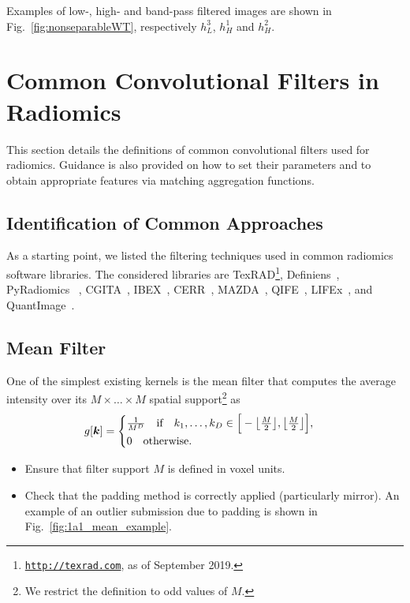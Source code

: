 \documentclass[fleqn,a4paper,oneside,openany]{book}
\DeclarePairedDelimiter\floor{\lfloor}{\rfloor}
\begin{document}
Examples of low-, high- and band-pass filtered images are shown in Fig.~\ref{fig:nonseparableWT}, respectively $h_L^3$, $h_H^1$ and $h_H^2$.
%
\chapter{Common Convolutional Filters in Radiomics}\label{sec:filtersDescription}
%
This section details the definitions of common convolutional filters used for radiomics. Guidance is also provided on how to set their parameters and to obtain appropriate features via matching aggregation functions.
%
\section{Identification of Common Approaches}
%
As a starting point, we listed the filtering techniques used in common radiomics software libraries. 
The considered libraries are TexRAD\footnote{\texttt{\url{http://texrad.com}}, as of September 2019.}, Definiens~\cite{BGW2014}, PyRadiomics~\cite{Van_Griethuysen2017-qp} , CGITA~\cite{FLS2014}, IBEX~\cite{ZFF2015}, CERR~\cite{Apte2018-sf}, MAZDA~\cite{SzK2017}, QIFE~\cite{EBR2017}, LIFEx~\cite{Nioche2018-jr}, and QuantImage~\cite{DCS2017}.
%
\section{Mean Filter} \label{subsec:meanFilter}
%
One of the simplest existing kernels is the mean filter that computes the average intensity over its $M\times\dots\times M$ spatial support\footnote{We restrict the definition to odd values of $M$.} as
%
\begin{equation}\label{eq:meanFilter}
g[\boldsymbol{k}]= 
\begin{cases}
\frac{1}{M^D} \quad\text{if}\quad k_1,\dots,k_D \in  \Big[ -\floor*{\frac{M}{2}},\floor*{\frac{M}{2}} \Big],\\
0\quad\text{otherwise}.
\end{cases}
\end{equation}
%

\vspace{2mm}
\begin{tcolorbox}[width=150mm, halign=left, colframe=black, colback=white, boxsep=0mm, arc=3mm, colframe=black!50!white,
title=Implementation Troubleshooting, title filled=true, fonttitle=\bfseries]
\begin{itemize}
\itemsep0em 
\item Ensure that filter support $M$ is defined in voxel units. 
\item Check that the padding method is correctly applied (particularly mirror). An example of an outlier submission due to padding is shown in Fig.\ \ref{fig:1a1_mean_example}.
\end{itemize}
\end{tcolorbox}
\end{document}

